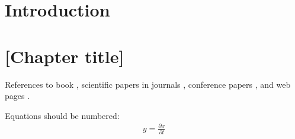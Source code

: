 \documentclass[a4paper,twoside,12pt]{book}
\newcounter{pagesWithoutNumbers}
\begin{document}
\setcounter{pagesWithoutNumbers}{\value{page}}
\mainmatter
\pagestyle{empty}

\cleardoublepage

\pagestyle{PageNumbersChapterTitles}


\chapter{Introduction}





\chapter{[Chapter title]}



References to
book \cite{bib:book},
scientific papers in journals \cite{bib:article},
conference papers \cite{bib:conference},
and web pages \cite{bib:internet}.

Equations should be numbered:
\begin{align}
y = \frac{\partial x}{\partial t}
\end{align}
\end{document}
